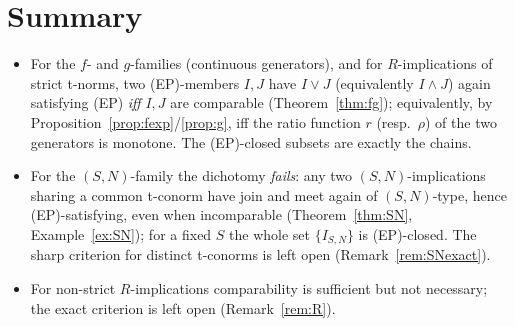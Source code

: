 \documentclass{amsart}
\theoremstyle{plain}
\theoremstyle{definition}
\begin{document}
\section{Summary}

\begin{itemize}
\item For the $f$- and $g$-families (continuous generators), and for $R$-implications of
strict t-norms, two (EP)-members $I,J$ have $I\vee J$ (equivalently $I\wedge J$) again
satisfying (EP) \emph{iff} $I,J$ are comparable (Theorem~\ref{thm:fg}); equivalently, by
Proposition~\ref{prop:fexp}/\ref{prop:g}, iff the ratio function $r$ (resp.\ $\rho$) of the
two generators is monotone.  The (EP)-closed subsets are exactly the chains.
\item For the $(S,N)$-family the dichotomy \emph{fails}: any two $(S,N)$-implications sharing
a common t-conorm have join and meet again of $(S,N)$-type, hence (EP)-satisfying, even when
incomparable (Theorem~\ref{thm:SN}, Example~\ref{ex:SN}); for a fixed $S$ the whole set
$\{I_{S,N}\}$ is (EP)-closed.  The sharp criterion for distinct t-conorms is left open
(Remark~\ref{rem:SNexact}).
\item For non-strict $R$-implications comparability is sufficient but not necessary; the
exact criterion is left open (Remark~\ref{rem:R}).
\end{itemize}
\end{document}

